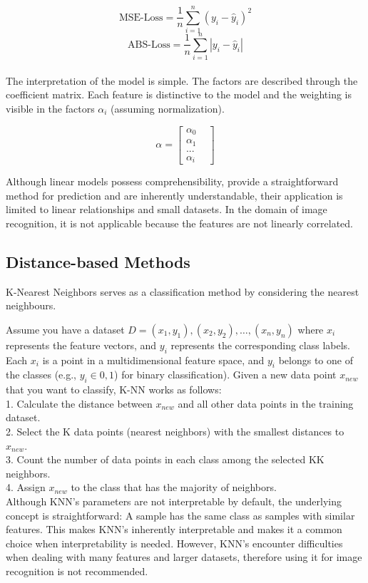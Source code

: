$$ \text{MSE-Loss} = \frac{1}{n} \sum_{i=1}^{n} (y_i - \hat{y}_i)^2$$
$$ \text{ABS-Loss} = \frac{1}{n} \sum_{i=1}^{n} |y_i - \hat{y}_i|$$
\\
The interpretation of the model is simple. The factors are described through the coefficient matrix. Each feature is distinctive to the model and the weighting is visible in the factors $\alpha_{i}$ (assuming normalization).

$$ \alpha = \begin{bmatrix}
	\alpha_0 & \\
	\alpha_1 & \\
	... & \\
	\alpha_i &
\end{bmatrix}
$$

Although linear models possess comprehensibility, provide a straightforward method for prediction and are inherently understandable, their application is limited to linear relationships and small datasets. In the domain of image recognition, it is not applicable because the features are not linearly correlated.

\subsection{Distance-based Methods}
\label{KNN}
K-Nearest Neighbors serves as a classification method by considering the nearest neighbours. 


Assume you have a dataset $D={(x_1,y_1),(x_2,y_2),…,(x_n,y_n)}$ where $x_i$ represents the feature vectors, and $y_i$ represents the corresponding class labels. Each $x_i$ is a point in a multidimensional feature space, and $y_i$ belongs to one of the classes (e.g., $y_i \in 0,1$) for binary classification). 
Given a new data point $x_{new}$ that you want to classify, K-NN works as follows:\\

1. Calculate the distance between $x_{new}$ and all other data points in the training dataset.\\
2. Select the K data points (nearest neighbors) with the smallest distances to $x_{new}$.\\
3. Count the number of data points in each class among the selected KK neighbors.\\
4. Assign $x_{new}$ to the class that has the majority of neighbors.\\

Although KNN's parameters are not interpretable by default, the underlying concept is straightforward: A sample has the same class as samples with similar features. This makes KNN's inherently interpretable and makes it a common choice when interpretability is needed. However, KNN's encounter difficulties when dealing with many features and larger datasets, therefore using it for image recognition is not recommended.

